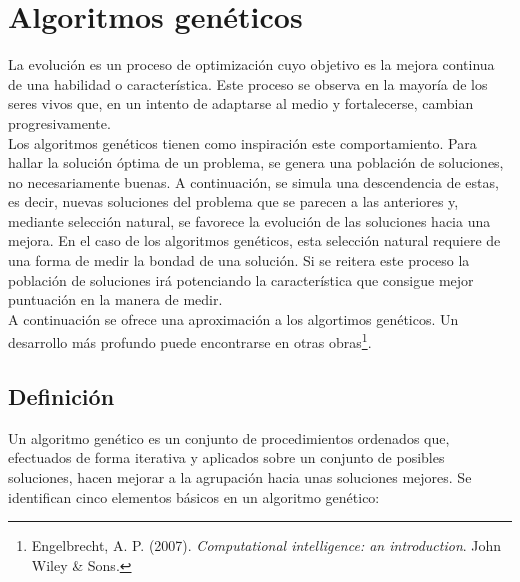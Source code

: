 \section{Algoritmos gen\'eticos}\label{sec:genetico}
		La evoluci\'on es un proceso de optimizaci\'on cuyo objetivo es la mejora continua de una habilidad o caracter\'istica. Este proceso se observa en la mayor\'ia de los seres vivos que, en un intento de adaptarse al medio y fortalecerse, cambian progresivamente.\\
		
		Los algoritmos gen\'eticos tienen como inspiraci\'on este comportamiento. Para hallar la soluci\'on \'optima de un problema, se genera una poblaci\'on de soluciones, no necesariamente buenas. A continuaci\'on, se simula una descendencia de estas, es decir, nuevas soluciones del problema que se parecen a las anteriores y, mediante selecci\'on natural, se favorece la evoluci\'on de las soluciones hacia una mejora. En el caso de los algoritmos gen\'eticos, esta selecci\'on natural requiere de una forma de medir la bondad de una soluci\'on. Si se reitera este proceso la poblaci\'on de soluciones ir\'a potenciando la caracter\'istica que consigue mejor puntuaci\'on en la manera de medir.\\ 
		
		A continuaci\'on se ofrece una aproximaci\'on a los algortimos gen\'eticos. Un desarrollo m\'as profundo puede encontrarse en otras obras\footnote{Engelbrecht, A. P. (2007). \textit{Computational intelligence: an introduction}. John Wiley \& Sons.  }.
		
		\subsection{Definici\'on}
		Un algoritmo gen\'etico es un conjunto de procedimientos ordenados que, efectuados de forma iterativa y aplicados sobre un conjunto de posibles soluciones, hacen mejorar a la agrupaci\'on hacia unas soluciones mejores. Se identifican cinco elementos b\'asicos en un algoritmo gen\'etico:
		
